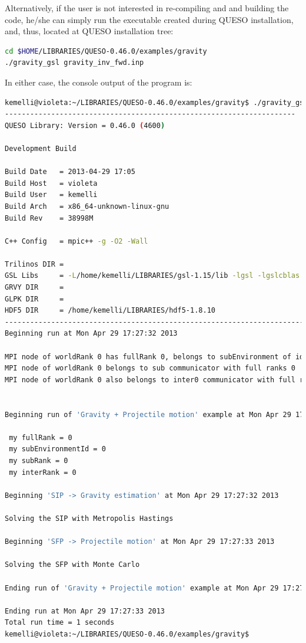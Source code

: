 Alternatively, if the user is not interested in re-compiling and and building the code, he/she can simply run the executable created during QUESO installation, and, thus, located at QUESO installation tree: 
\begin{lstlisting}[caption={}, label={},language={bash}]
cd $HOME/LIBRARIES/QUESO-0.46.0/examples/gravity
./gravity_gsl gravity_inv_fwd.inp
\end{lstlisting}
 
In either case, the console output of the program is:
\begin{lstlisting}[caption={Console output of program \texttt{gravity\_gsl}}, label={code:console_output},language={bash}]
kemelli@violeta:~/LIBRARIES/QUESO-0.46.0/examples/gravity$ ./gravity_gsl gravity_inv_fwd.inp 
---------------------------------------------------------------------
QUESO Library: Version = 0.46.0 (4600)

Development Build

Build Date   = 2013-04-29 17:05
Build Host   = violeta
Build User   = kemelli
Build Arch   = x86_64-unknown-linux-gnu
Build Rev    = 38998M

C++ Config   = mpic++ -g -O2 -Wall

Trilinos DIR = 
GSL Libs     = -L/home/kemelli/LIBRARIES/gsl-1.15/lib -lgsl -lgslcblas -lm
GRVY DIR     = 
GLPK DIR     = 
HDF5 DIR     = /home/kemelli/LIBRARIES/hdf5-1.8.10
--------------------------------------------------------------------------------------------------------------
Beginning run at Mon Apr 29 17:27:32 2013

MPI node of worldRank 0 has fullRank 0, belongs to subEnvironment of id 0, and has subRank 0
MPI node of worldRank 0 belongs to sub communicator with full ranks 0
MPI node of worldRank 0 also belongs to inter0 communicator with full ranks 0, and has inter0Rank 0


Beginning run of 'Gravity + Projectile motion' example at Mon Apr 29 17:27:32 2013

 my fullRank = 0
 my subEnvironmentId = 0
 my subRank = 0
 my interRank = 0

Beginning 'SIP -> Gravity estimation' at Mon Apr 29 17:27:32 2013

Solving the SIP with Metropolis Hastings

Beginning 'SFP -> Projectile motion' at Mon Apr 29 17:27:33 2013

Solving the SFP with Monte Carlo

Ending run of 'Gravity + Projectile motion' example at Mon Apr 29 17:27:33 2013

Ending run at Mon Apr 29 17:27:33 2013
Total run time = 1 seconds
kemelli@violeta:~/LIBRARIES/QUESO-0.46.0/examples/gravity$ 
\end{lstlisting}


